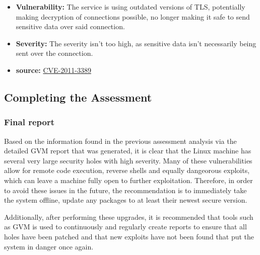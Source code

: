 \begin{itemize}
\begin{itemize}
              \item \textbf{Vulnerability:} The service is using outdated versions of TLS, potentially making decryption of connections possible, no longer making it safe to send sensitive data over said connection.
              \item \textbf{Severity:} The severity isn't too high, as sensitive data isn't necessarily being sent over the connection.
              \item \textbf{source:} \href{https://cve.mitre.org/cgi-bin/cvename.cgi?name=CVE-2011-3389}{CVE-2011-3389}
          \end{itemize}
\end{itemize}

\subsection{Completing the Assessment}
\subsubsection{Final report}
Based on the information found in the previous assessment analysis via the detailed GVM report that was generated, it is clear that the Linux machine has several very large security holes with high severity. Many of these vulnerabilities allow for remote code execution, reverse shells and equally dangeorous exploits, which can leave a machine fully open to further exploitation. Therefore, in order to avoid these issues in the future, the recommendation is to immediately take the system offline, update any packages to at least their newest secure version.

Additionally, after performing these upgrades, it is recommended that tools such as GVM is used to continuously and regularly create reports to ensure that all holes have been patched and that new exploits have not been found that put the system in danger once again.